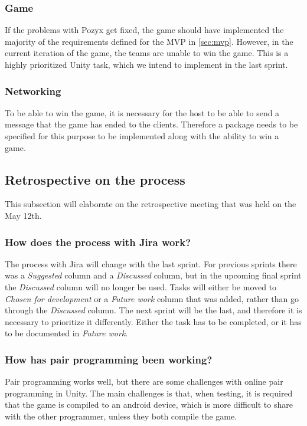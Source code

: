 \subsubsection{Game}
If the problems with Pozyx get fixed, the game should have implemented the majority of the requirements defined for the MVP in \autoref{sec:mvp}.
However, in the current iteration of the game, the teams are unable to win the game.
This is a highly prioritized Unity task, which we intend to implement in the last sprint.

\subsubsection{Networking}
To be able to win the game, it is necessary for the host to be able to send a message that the game has ended to the clients.
Therefore a package needs to be specified for this purpose to be implemented along with the ability to win a game.

\subsection{Retrospective on the process}
This subsection will elaborate on the retrospective meeting that was held on the May 12th.

\subsubsection*{How does the process with Jira work?}
The process with Jira will change with the last sprint.
For previous sprints there was a \textit{Suggested} column and a \textit{Discussed} column, but in the upcoming final sprint the \textit{Discussed} column will no longer be used.
Tasks will either be moved to \textit{Chosen for development} or a \textit{Future work} column that was added, rather than go through the \textit{Discussed} column.
The next sprint will be the last, and therefore it is necessary to prioritize it differently.
Either the task has to be completed, or it has to be documented in \textit{Future work}.

\subsubsection*{How has pair programming been working?}
Pair programming works well, but there are some challenges with online pair programming in Unity.
The main challenges is that, when testing, it is required that the game is compiled to an android device, which is more difficult to share with the other programmer, unless they both compile the game.

